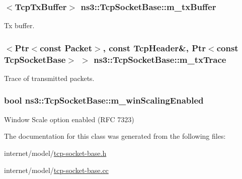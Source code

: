 \subsubsection[{\texorpdfstring{m\+\_\+tx\+Buffer}{m_txBuffer}}]{$<${\bf Tcp\+Tx\+Buffer}$>$ ns3\+::\+Tcp\+Socket\+Base\+::m\+\_\+tx\+Buffer\hspace{0.3cm}{\ttfamily [protected]}}\hypertarget{classns3_1_1TcpSocketBase_a4a1b53982ffd851bd07ab8d5005c130e}{}\label{classns3_1_1TcpSocketBase_a4a1b53982ffd851bd07ab8d5005c130e}


Tx buffer. 

\subsubsection[{\texorpdfstring{m\+\_\+tx\+Trace}{m_txTrace}}]{$<${\bf Ptr}$<$const {\bf Packet}$>$, const {\bf Tcp\+Header}\&, {\bf Ptr}$<$const {\bf Tcp\+Socket\+Base}$>$ $>$ ns3\+::\+Tcp\+Socket\+Base\+::m\+\_\+tx\+Trace\hspace{0.3cm}{\ttfamily [protected]}}\hypertarget{classns3_1_1TcpSocketBase_a133b5c147fbc16ef12d4788c620cca3c}{}\label{classns3_1_1TcpSocketBase_a133b5c147fbc16ef12d4788c620cca3c}


Trace of transmitted packets. 

\subsubsection[{\texorpdfstring{m\+\_\+win\+Scaling\+Enabled}{m_winScalingEnabled}}]{\setlength{\rightskip}{0pt plus 5cm}bool ns3\+::\+Tcp\+Socket\+Base\+::m\+\_\+win\+Scaling\+Enabled\hspace{0.3cm}{\ttfamily [protected]}}\hypertarget{classns3_1_1TcpSocketBase_a80ff21f228d3334f17dcf56f14fa0c7c}{}\label{classns3_1_1TcpSocketBase_a80ff21f228d3334f17dcf56f14fa0c7c}


Window Scale option enabled (R\+FC 7323) 



The documentation for this class was generated from the following files\+:\begin{DoxyCompactItemize}
\item 
internet/model/\hyperlink{tcp-socket-base_8h}{tcp-\/socket-\/base.\+h}\item 
internet/model/\hyperlink{tcp-socket-base_8cc}{tcp-\/socket-\/base.\+cc}\end{DoxyCompactItemize}
